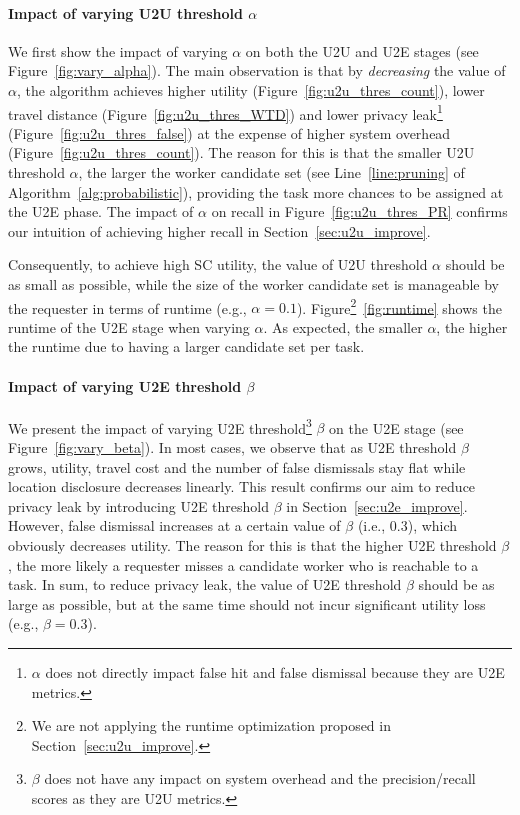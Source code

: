 \documentclass{USC-Thesis}
\numberwithin{equation}{chapter}
\begin{document}
\paragraph{Impact of varying U2U threshold $\alpha$}
We first show the impact of varying $\alpha$ on both the U2U and U2E stages (see Figure~\ref{fig:vary_alpha}). The main observation is that by \emph{decreasing} the value of $\alpha$, the algorithm achieves higher utility (Figure~\ref{fig:u2u_thres_count}), lower travel distance (Figure~\ref{fig:u2u_thres_WTD}) and lower privacy leak\footnote{$\alpha$ does not directly impact false hit and false dismissal because they are U2E metrics.} (Figure~\ref{fig:u2u_thres_false}) at the expense of higher system overhead (Figure~\ref{fig:u2u_thres_count}). The reason for this is that the smaller U2U threshold $\alpha$, the larger the worker candidate set (see Line~\ref{line:pruning} of Algorithm~\ref{alg:probabilistic}), providing the task more chances to be assigned at the U2E phase. The impact of $\alpha$ on recall in Figure~\ref{fig:u2u_thres_PR} confirms our intuition of achieving higher recall in Section~\ref{sec:u2u_improve}.

Consequently, to achieve high SC utility, the value of U2U threshold $\alpha$ should be as small as possible, while the size of the worker candidate set is manageable by the requester in terms of runtime (e.g., $\alpha=0.1$). Figure\footnote{We are not applying the runtime optimization proposed in Section~\ref{sec:u2u_improve}.}~\ref{fig:runtime} shows the runtime of the U2E stage when varying $\alpha$. As expected, the smaller $\alpha$, the higher the runtime due to having a larger candidate set per task.

\paragraph{Impact of varying U2E threshold $\beta$}
We present the impact of varying U2E threshold\footnote{$\beta$ does not have any impact on system overhead and the precision/recall scores as they are U2U metrics.} $\beta$ on the U2E stage (see Figure~\ref{fig:vary_beta}). In most cases, we observe that as U2E threshold $\beta$ grows, utility, travel cost and the number of false dismissals stay flat while location disclosure decreases linearly. This result confirms our aim to reduce privacy leak by introducing U2E threshold $\beta$ in Section~\ref{sec:u2e_improve}.
However, false dismissal increases at a certain value of $\beta$ (i.e., 0.3), which obviously decreases utility. The reason for this is that the higher U2E threshold $\beta$, the more likely a requester misses a candidate worker who is reachable to a task.
In sum, to reduce privacy leak, the value of U2E threshold $\beta$ should be as large as possible, but at the same time should not incur significant utility loss (e.g., $\beta=0.3$).
\end{document}
